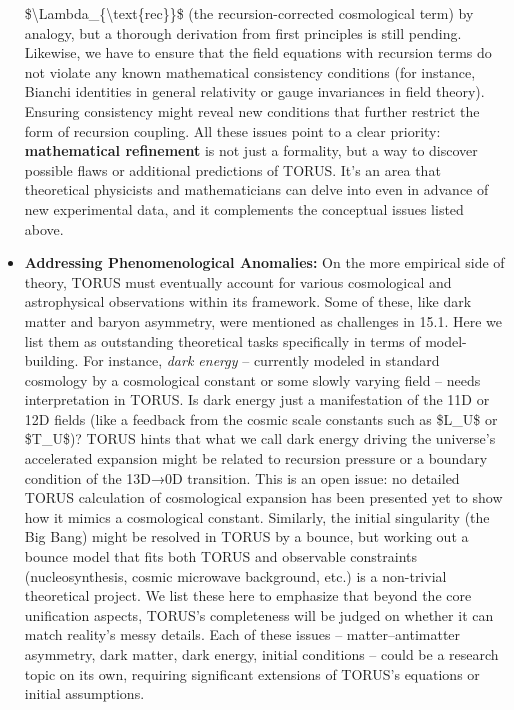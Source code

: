 \documentclass[
]{article}
\begin{document}
\begin{itemize}
  \$\textbackslash Lambda\_\{\textbackslash text\{rec\}\}\$ (the
  recursion-corrected cosmological term) by analogy, but a thorough
  derivation from first principles is still pending. Likewise, we have
  to ensure that the field equations with recursion terms do not violate
  any known mathematical consistency conditions (for instance, Bianchi
  identities in general relativity or gauge invariances in field
  theory). Ensuring consistency might reveal new conditions that further
  restrict the form of recursion coupling. All these issues point to a
  clear priority: \textbf{mathematical refinement} is not just a
  formality, but a way to discover possible flaws or additional
  predictions of TORUS. It's an area that theoretical physicists and
  mathematicians can delve into even in advance of new experimental
  data, and it complements the conceptual issues listed above.
\item
  \textbf{Addressing Phenomenological Anomalies:} On the more empirical
  side of theory, TORUS must eventually account for various cosmological
  and astrophysical observations within its framework. Some of these,
  like dark matter and baryon asymmetry, were mentioned as challenges in
  15.1. Here we list them as outstanding theoretical tasks specifically
  in terms of model-building. For instance, \emph{dark energy} --
  currently modeled in standard cosmology by a cosmological constant or
  some slowly varying field -- needs interpretation in TORUS. Is dark
  energy just a manifestation of the 11D or 12D fields (like a feedback
  from the cosmic scale constants such as \$L\_U\$ or \$T\_U\$)? TORUS
  hints that what we call dark energy driving the universe's accelerated
  expansion might be related to recursion pressure or a boundary
  condition of the 13D→0D transition. This is an open issue: no detailed
  TORUS calculation of cosmological expansion has been presented yet to
  show how it mimics a cosmological constant. Similarly, the initial
  singularity (the Big Bang) might be resolved in TORUS by a bounce, but
  working out a bounce model that fits both TORUS and observable
  constraints (nucleosynthesis, cosmic microwave background, etc.) is a
  non-trivial theoretical project. We list these here to emphasize that
  beyond the core unification aspects, TORUS's completeness will be
  judged on whether it can match reality's messy details. Each of these
  issues -- matter--antimatter asymmetry, dark matter, dark energy,
  initial conditions -- could be a research topic on its own, requiring
  significant extensions of TORUS's equations or initial assumptions.

\end{itemize}
\end{document}
